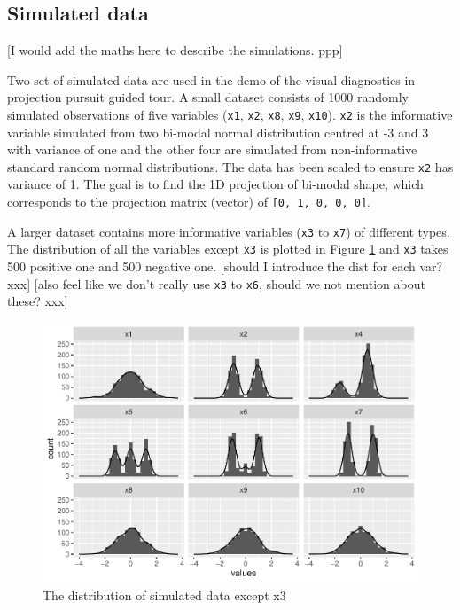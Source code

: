 \documentclass[12pt]{article}
\begin{document}
\hypertarget{simulated-data}{%
\subsection{Simulated data}\label{simulated-data}}

{[}I would add the maths here to describe the simulations. ppp{]}

Two set of simulated data are used in the demo of the visual diagnostics
in projection pursuit guided tour. A small dataset consists of 1000
randomly simulated observations of five variables (\texttt{x1},
\texttt{x2}, \texttt{x8}, \texttt{x9}, \texttt{x10}). \texttt{x2} is the
informative variable simulated from two bi-modal normal distribution
centred at -3 and 3 with variance of one and the other four are
simulated from non-informative standard random normal distributions. The
data has been scaled to ensure \texttt{x2} has variance of 1. The goal
is to find the 1D projection of bi-modal shape, which corresponds to the
projection matrix (vector) of \texttt{{[}0,\ 1,\ 0,\ 0,\ 0{]}}.

A larger dataset contains more informative variables (\texttt{x3} to
\texttt{x7}) of different types. The distribution of all the variables
except \texttt{x3} is plotted in Figure \ref{origin-data} and
\texttt{x3} takes 500 positive one and 500 negative one. {[}should I
introduce the dist for each var? xxx{]} {[}also feel like we don't
really use \texttt{x3} to \texttt{x6}, should we not mention about
these? xxx{]}

\begin{figure}
\centering
\includegraphics{paper_files/figure-latex/origin-data-1.pdf}
\caption{\label{origin-data} The distribution of simulated data except
x3}
\end{figure}
\end{document}
